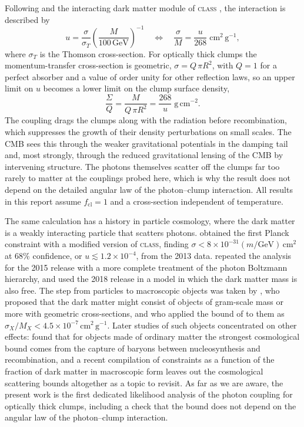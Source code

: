 \documentclass[11pt,a4paper]{article}
\newcommand{\cl}{\mathrm{cl}}
\begin{document}
Following \citet{StadlerBoehm2018} and the interacting dark matter module of \textsc{class} \citep{Lesgourgues2011,Becker2021}, the interaction is described by
\begin{equation}
u = \frac{\sigma}{\sigma_T}\left(\frac{M}{100\,\mathrm{GeV}}\right)^{-1}
\quad\Longleftrightarrow\quad
\frac{\sigma}{M} = \frac{u}{268}\;\mathrm{cm^2\,g^{-1}},
\end{equation}
where $\sigma_T$ is the Thomson cross-section. For optically thick clumps the momentum-transfer cross-section is geometric, $\sigma = Q\,\pi R^2$, with $Q=1$ for a perfect absorber and a value of order unity for other reflection laws, so an upper limit on $u$ becomes a lower limit on the clump surface density,
\begin{equation}
\frac{\Sigma}{Q} = \frac{M}{Q\,\pi R^2} = \frac{268}{u}\;\mathrm{g\,cm^{-2}} .
\end{equation}
The coupling drags the clumps along with the radiation before recombination, which suppresses the growth of their density perturbations on small scales. The CMB sees this through the weaker gravitational potentials in the damping tail and, most strongly, through the reduced gravitational lensing of the CMB by intervening structure. The photons themselves scatter off the clumps far too rarely to matter at the couplings probed here, which is why the result does not depend on the detailed angular law of the photon--clump interaction. All results in this report assume $f_\cl = 1$ and a cross-section independent of temperature.

The same calculation has a history in particle cosmology, where the dark matter is a weakly interacting particle that scatters photons. \citet{Wilkinson2014} obtained the first Planck constraint with a modified version of \textsc{class}, finding $\sigma < 8\times10^{-31}(m/\mathrm{GeV})\,\mathrm{cm^2}$ at 68\% confidence, or $u \lesssim 1.2\times10^{-4}$, from the 2013 data. \citet{StadlerBoehm2018} repeated the analysis for the 2015 release with a more complete treatment of the photon Boltzmann hierarchy, and \citet{Zhou2022} used the 2018 release in a model in which the dark matter mass is also free. The step from particles to macroscopic objects was taken by \citet{Jacobs2015}, who proposed that the dark matter might consist of objects of gram-scale mass or more with geometric cross-sections, and who applied the bound of \citet{Wilkinson2014} to them as $\sigma_X/M_X < 4.5\times10^{-7}\,\mathrm{cm^2\,g^{-1}}$. Later studies of such objects concentrated on other effects: \citet{Caloni2021} found that for objects made of ordinary matter the strongest cosmological bound comes from the capture of baryons between nucleosynthesis and recombination, and a recent compilation of constraints as a function of the fraction of dark matter in macroscopic form \citep{Picker2026} leaves out the cosmological scattering bounds altogether as a topic to revisit. As far as we are aware, the present work is the first dedicated likelihood analysis of the photon coupling for optically thick clumps, including a check that the bound does not depend on the angular law of the photon--clump interaction.
\end{document}

